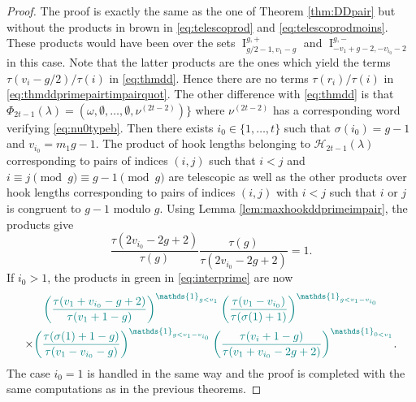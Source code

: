 \documentclass[11pt,letterpaper]{amsart}
\def\cch{\mathcal H}
\DeclareMathOperator{\I}{I}
\numberwithin{equation}{section}
\numberwithin{df}{section}
\begin{document}
\begin{proof}
The proof is exactly the same as the one of Theorem \ref{thm:DDpair} but without the products in brown in \eqref{eq:telescoprod} and \eqref{eq:telescoprodmoins}. These products would have been over the sets $\I_{g/2-1,v_1-g}^{g,+}$  and $\I_{-v_1+g-2,-v_{i_0}-2}^{g,-}$ in this case. Note that the latter products are the ones which yield the terms $\tau(v_i-g/2)/\tau(i)$ in \eqref{eq:thmdd}. Hence there are no terms $\tau(r_i)/\tau(i)$ in \eqref{eq:thmddprimepairtimpairquot}. The other difference with \eqref{eq:thmdd} is that $\Phi_{2t-1}(\lambda)=(\omega,\emptyset,\dots,\emptyset,\nu^{(2t-2)})\rbrace$ where $\nu^{(2t-2)}$ has a corresponding word verifying \eqref{eq:nu0typeb}. Then there exists $i_0\in\lbrace 1,\dots,t\rbrace$ such that $\sigma(i_0)=g-1$ and $v_{i_0}=m_1g-1$. The product of hook lengths belonging to $\cch_{2t-1}(\lambda)$ corresponding to pairs of indices $(i,j)$ such that $i<j$ and $i\equiv j \pmod{g}\equiv g-1\pmod{g}$ are telescopic as well as the other products over hook lengths corresponding to pairs of indices $(i,j)$ with $i<j$ such that $i$ or $j$ is congruent to $g-1$ modulo $g$. Using Lemma \ref{lem:maxhookddprimeimpair}, the products give 
\begin{equation*}
\frac{\tau(2v_{i_0}-2g+2)}{\tau(g)}\frac{\tau(g)}{\tau(2v_{i_0}-2g+2)}=1.
\end{equation*}
If $i_0>1$, the products in green in \eqref{eq:interprime} are now
\begin{multline*}
\textcolor{teal}{\left(\frac{\tau(v_1+v_{i_0}-g+2)}{\tau(v_1+1-g)}\right)^{\mathds{1}_{g<v_1}}\left(\frac{\tau(v_1-v_{i_0})}{\tau(\sigma(1)+1)}\right)^{\mathds{1}_{g<v_1-v_{i_0}}}}\\
\times\textcolor{teal}{\left(\frac{\tau(\sigma(1)+1-g)}{\tau(v_1-v_{i_0}-g)}\right)^{\mathds{1}_{g<v_1-v_{i_0}}}\left(\frac{\tau(v_i+1-g)}{\tau(v_1+v_{i_0}-2g+2)}\right)^{\mathds{1}_{0<v_1}}}.
\end{multline*}
The case $i_0=1$ is handled in the same way and the proof is completed with the same computations as in the previous theorems.
\end{proof}
\end{document}
